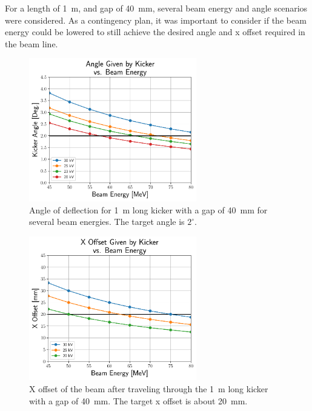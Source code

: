For a length of \SI{1}{m}, and gap of \SI{40}{mm}, 
several beam energy and angle scenarios were considered.
As a contingency plan, it was important to consider if the 
beam energy could be lowered to still achieve the desired 
angle and x offset required in the beam line. 
\begin{figure}%
	\begin{center}
		\includegraphics[width=0.65\textwidth]{./images/AngleVsEnergy}
		\caption{Angle of deflection for \SI{1}{m} long 
		kicker with a gap of \SI{40}{mm} for several beam energies. The target angle is $2^\circ$.}
		\label{fig:kickerangles}
	\end{center}
\end{figure}
\begin{figure}%
	\begin{center}
		\includegraphics[width=0.65\textwidth]{./images/XoffsetVsEnergy}
		\caption{X offset of the beam after traveling
		through the \SI{1}{m} long kicker with a gap of \SI{40}{mm}.
		The target x offset is about \SI{20}{mm}.}
		\label{fig:kickeroffset}
	\end{center}
\end{figure}
